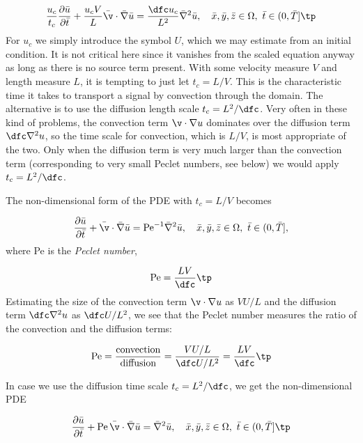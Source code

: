 \documentclass[graybox,envcountchap,sectrefs,final]{svmonodo}
\begin{document}
\[
\frac{u_c}{t_c}
\frac{\partial \bar u}{\partial \bar t} +
\frac{u_c V}{L}\bar\v\cdot\bar\nabla\bar u =
\frac{\dfc u_c}{L^2}\bar\nabla^2\bar u,
\quad \bar x,\bar y,\bar z\in \Omega,\ \bar t\in (0,\bar T]\tp
\]
For $u_c$ we simply introduce the symbol $U$, which we may estimate
from an initial condition. It is not critical here since it vanishes
from the scaled equation anyway as long as there is no source term
present.
With some velocity measure $V$ and length measure $L$, it is
tempting to just let $t_c = L/V$. This is the characteristic time it takes to
transport a signal by convection through the domain.
The alternative is to use the
diffusion length scale $t_c=L^2/\dfc$. Very often in these kind of
problems, the convection term $\v\cdot\nabla u$ dominates over the
diffusion term $\dfc\nabla^2 u$, so the time scale for convection,
which is $L/V$,
is most appropriate of the two. Only when
the diffusion term is very much larger than the convection
term (corresponding to very small Peclet numbers, see below)
we would apply $t_c=L^2/\dfc$.

The non-dimensional form of the PDE with $t_c=L/V$ becomes

\begin{equation}
\frac{\partial \bar u}{\partial \bar t} +
\bar\v\cdot\bar\nabla\bar u =
\hbox{Pe}^{-1}\bar\nabla^2\bar u,
\quad \bar x,\bar y,\bar z\in \Omega,\ \bar t\in (0,\bar T],
\label{scale:convdiff:pde1:d}
\end{equation}
where Pe is the \emph{Peclet number},

\[ \hbox{Pe} = \frac{LV}{\dfc}\tp\]
Estimating the size of the convection term $\v\cdot\nabla u$ as
$VU/L$ and the diffusion term $\dfc\nabla^2 u$ as $\dfc U/L^2$,
we see that the Peclet number measures the ratio of the convection
and the diffusion terms:

\[ \hbox{Pe} = \frac{\hbox{convection}}{\hbox{diffusion}} =
\frac{VU/L}{\dfc U/L^2}= \frac{LV}{\dfc}\tp
\]

In case we use the diffusion time scale
$t_c=L^2/\dfc$, we get the non-dimensional PDE

\begin{equation}
\frac{\partial \bar u}{\partial \bar t} +
\hbox{Pe}\,\bar\v\cdot\bar\nabla\bar u =
\bar\nabla^2\bar u,
\quad \bar x,\bar y,\bar z\in \Omega,\ \bar t\in (0,\bar T]\tp
\label{scale:convdiff:pde1:d2}
\end{equation}
\end{document}
